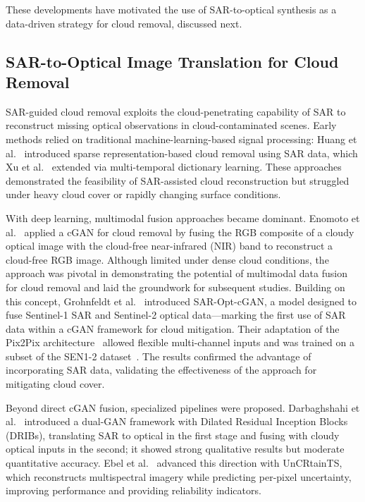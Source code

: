 \documentclass[remotesensing,article,submit,pdftex,moreauthors]{Definitions/mdpi}
\begin{document}
These developments have motivated the use of SAR-to-optical synthesis as a data-driven strategy for cloud removal, discussed next.

\subsection{SAR-to-Optical Image Translation for Cloud Removal}
SAR-guided cloud removal exploits the cloud-penetrating capability of SAR to reconstruct missing optical observations in cloud-contaminated scenes. Early methods relied on traditional machine-learning-based signal processing: Huang et al.~\cite{huang2015} introduced sparse representation-based cloud removal using SAR data, which Xu et al.~\cite{CR_spars_repre_MT_dict_L} extended via multi-temporal dictionary learning. These approaches demonstrated the feasibility of SAR-assisted cloud reconstruction but struggled under heavy cloud cover or rapidly changing surface conditions.

With deep learning, multimodal fusion approaches became dominant. Enomoto et al.~\cite{filmy_cloudy_NIR_Enomoto} applied a cGAN for cloud removal by fusing the RGB composite of a cloudy optical image with the cloud-free near-infrared (NIR) band to reconstruct a cloud-free RGB image. Although limited under dense cloud conditions, the approach was pivotal in demonstrating the potential of multimodal data fusion for cloud removal and laid the groundwork for subsequent studies. Building on this concept, Grohnfeldt et al.~\cite{A_cGAN_fuse_sar_MS_CR} introduced SAR-Opt-cGAN, a model designed to fuse Sentinel-1 SAR and Sentinel-2 optical data—marking the first use of SAR data within a cGAN framework for cloud mitigation. Their adaptation of the Pix2Pix architecture~\cite{pix2pix_2018} allowed flexible multi-channel inputs and was trained on a subset of the SEN1-2 dataset~\cite{sen12_2018}. The results confirmed the advantage of incorporating SAR data, validating the effectiveness of the approach for mitigating cloud cover.

Beyond direct cGAN fusion, specialized pipelines were proposed. Darbaghshahi et al.~\cite{CR_RS_GAN_s2o} introduced a dual-GAN framework with Dilated Residual Inception Blocks (DRIBs), translating SAR to optical in the first stage and fusing with cloudy optical inputs in the second; it showed strong qualitative results but moderate quantitative accuracy. Ebel et al.~\cite{UnCRtainTS} advanced this direction with UnCRtainTS, which reconstructs multispectral imagery while predicting per-pixel uncertainty, improving performance and providing reliability indicators.
\end{document}
